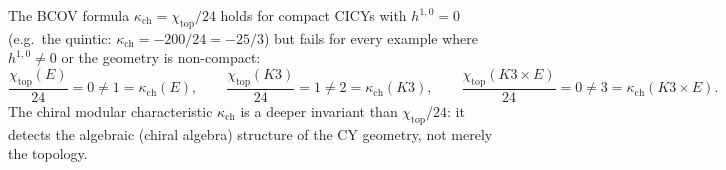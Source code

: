 \begin{remark}
\label{rem:chi-top-24-failure}
The BCOV formula $\kappa_{\mathrm{ch}} = \chi_{\mathrm{top}}/24$ holds for compact CICYs with $h^{1,0} = 0$ (e.g.\ the quintic: $\kappa_{\mathrm{ch}} = -200/24 = -25/3$) but fails for every example where $h^{1,0} \neq 0$ or the geometry is non-compact:
\[
 \frac{\chi_{\mathrm{top}}(E)}{24} = 0 \neq 1 = \kappa_{\mathrm{ch}}(E), \qquad
 \frac{\chi_{\mathrm{top}}(K3)}{24} = 1 \neq 2 = \kappa_{\mathrm{ch}}(K3), \qquad
 \frac{\chi_{\mathrm{top}}(K3 \times E)}{24} = 0 \neq 3 = \kappa_{\mathrm{ch}}(K3 \times E).
\]
The chiral modular characteristic $\kappa_{\mathrm{ch}}$ is a deeper invariant than $\chi_{\mathrm{top}}/24$: it detects the algebraic (chiral algebra) structure of the CY geometry, not merely the topology.
\end{remark}


